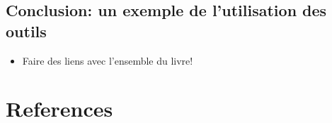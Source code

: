 \documentclass[
  letterpaper,
  DIV=11,
  numbers=noendperiod]{scrreprt}
\providecommand{\tightlist}{%
  \setlength{\itemsep}{0pt}\setlength{\parskip}{0pt}}\usepackage{longtable,booktabs,array}
\begin{document}
\hypertarget{conclusion-un-exemple-de-lutilisation-des-outils}{%
\section{Conclusion: un exemple de l'utilisation des
outils}\label{conclusion-un-exemple-de-lutilisation-des-outils}}

\begin{itemize}
\tightlist
\item
  Faire des liens avec l'ensemble du livre!
\end{itemize}


\hypertarget{section-2}{%
\chapter{}\label{section-2}}


\hypertarget{references}{%
\chapter*{References}\label{references}}

\end{document}
